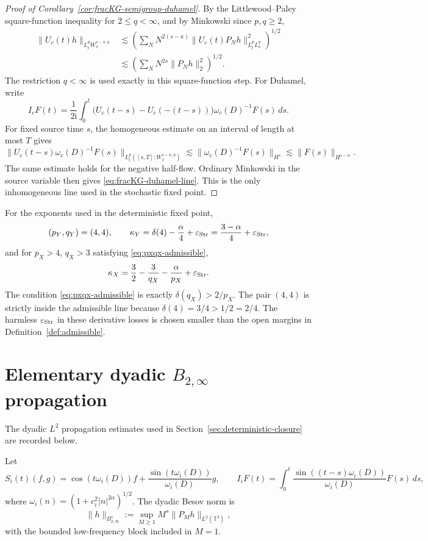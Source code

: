 \documentclass[10pt]{amsart}
\numberwithin{equation}{section}
\theoremstyle{plain}
\theoremstyle{definition}
\theoremstyle{remark}
\newcommand{\T}{\mathbb{T}}
\newcommand{\Btwo}{B_{2,\infty}}
\newcommand{\ii}{\mathrm{i}}
\begin{document}
\begin{proof}[Proof of Corollary~\ref{cor:fracKG-semigroup-duhamel}]
By the Littlewood--Paley square-function inequality for $2\le q<\infty$, and by Minkowski since $p,q\ge2$,
\[
\begin{aligned}
\|U_c(t)h\|_{L_t^pW_x^{s-\kappa,q}}
&\lesssim
\left(\sum_N N^{2(s-\kappa)}\|U_c(t)P_Nh\|_{L_t^pL_x^q}^2\right)^{1/2} \\
&\lesssim
\left(\sum_N N^{2s}\|P_Nh\|_2^2\right)^{1/2}.
\end{aligned}
\]
The restriction $q<\infty$ is used exactly in this square-function step.  For Duhamel, write
\[
        I_cF(t)=\frac1{2\ii}\int_0^t
        \bigl(U_c(t-s)-U_c(-(t-s))\bigr)\omega_c(D)^{-1}F(s)\,ds.
\]
For fixed source time $s$, the homogeneous estimate on an interval of length at most $T$ gives
\[
        \|U_c(t-s)\omega_c(D)^{-1}F(s)\|_{L_t^p([s,T];W_x^{s-\kappa,q})}
        \lesssim \|\omega_c(D)^{-1}F(s)\|_{H^s}
        \lesssim \|F(s)\|_{H^{s-\alpha}}.
\]
The same estimate holds for the negative half-flow.  Ordinary Minkowski in the source variable then gives \eqref{eq:fracKG-duhamel-line}.  This is the only inhomogeneous line used in the stochastic fixed point.
\end{proof}

For the exponents used in the deterministic fixed point,
\[
        (p_Y,q_Y)=(4,4),\qquad
        \kappa_Y=\delta(4)-\frac\alpha4+\varepsilon_{\rm Str}
        =\frac{3-\alpha}{4}+\varepsilon_{\rm Str},
\]
and for $p_X>4$, $q_X>3$ satisfying \eqref{eq:pxqx-admissible},
\[
        \kappa_X=\frac32-\frac3{q_X}-\frac\alpha{p_X}+\varepsilon_{\rm Str}.
\]
The condition \eqref{eq:pxqx-admissible} is exactly $\delta(q_X)>2/p_X$.  The pair $(4,4)$ is strictly inside the admissible line because $\delta(4)=3/4>1/2=2/4$.  The harmless $\varepsilon_{\rm Str}$ in these derivative losses is chosen smaller than the open margins in Definition~\ref{def:admissible}.

\section{Elementary dyadic \texorpdfstring{$B_{2,\infty}$}{B2,infty} propagation}\label{app:b2-propagation}

The dyadic $L^2$ propagation estimates used in Section~\ref{sec:deterministic-closure} are recorded below.

Let
\[
        S_i(t)(f,g)=\cos(t\omega_i(D))f+
        \frac{\sin(t\omega_i(D))}{\omega_i(D)}g,
        \qquad
        I_iF(t)=\int_0^t\frac{\sin((t-s)\omega_i(D))}{\omega_i(D)}F(s)\,ds,
\]
where $\omega_i(n)=(1+c_i^2|n|^{2\alpha})^{1/2}$.  The dyadic Besov norm is
\[
        \|h\|_{\Btwo^s}:=\sup_{M\ge1}M^s\|P_Mh\|_{L^2(\T^3)},
\]
with the bounded low-frequency block included in $M=1$.
\end{document}
